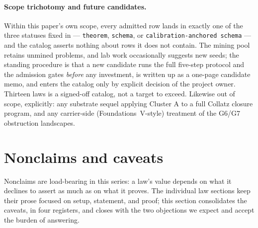 \documentclass[11pt]{article}
\theoremstyle{definition}
\begin{document}
\paragraph{Scope trichotomy and future candidates.} Within this paper's own scope, every admitted
row lands in exactly one of the three statuses fixed in  --- \texttt{theorem},
\texttt{schema}, or \texttt{calibration-anchored schema} --- and the catalog asserts nothing about
rows it does not contain. The mining pool retains unmined problems, and lab work occasionally
suggests new seeds; the standing procedure is that a new candidate runs the full five-step protocol
and the admission gates \emph{before} any investment, is written up as a one-page candidate memo,
and enters the catalog only by explicit decision of the project owner. Thirteen laws is a signed-off
catalog, not a target to exceed. Likewise out of scope, explicitly: any substrate sequel applying
Cluster A to a full Collatz closure program, and any carrier-side (Foundations~V-style) treatment of
the G6/G7 obstruction landscapes.

 \section{Nonclaims and caveats}\label{sec:nonclaims}

Nonclaims are load-bearing in this series: a law's value depends on what it declines to assert as
much as on what it proves. The individual law sections keep their prose focused on setup, statement,
and proof; this section consolidates the caveats, in four registers, and closes with the two
objections we expect and accept the burden of answering.
\end{document}
